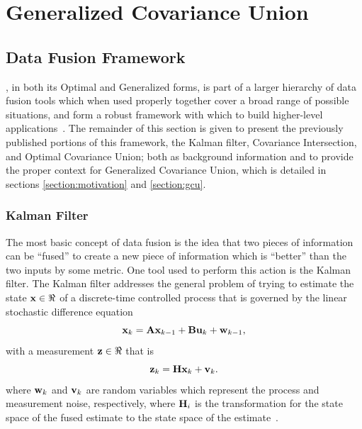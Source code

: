 \chapter{Generalized Covariance Union}\label{chapter:gcu}

\section{Data Fusion Framework}\label{section:framework}

, in both its Optimal and Generalized forms, is part of a larger hierarchy of data fusion
tools which when used properly together cover a broad range of possible situations, and form a robust framework with
which to build higher-level applications~\cite{fusion06,uhlmann03}. The remainder of this section is given to present
the previously published portions of this framework, the Kalman filter, Covariance Intersection, and Optimal Covariance
Union; both as background information and to provide the proper context for Generalized Covariance Union, which is 
detailed in sections \ref{section:motivation} and \ref{section:gcu}.


\subsection{Kalman Filter}

The most basic concept of data fusion is the idea that two pieces of information can be ``fused'' to create
a new piece of information which is ``better'' than the two inputs by some metric. One tool used to perform this action
is the Kalman filter. The Kalman filter addresses the general problem of trying to estimate the state $\mathbf{x}\in\Re$  of
a discrete-time controlled process that is governed by the linear stochastic difference equation
\begin{equation}\label{eqn:kalsto}
    \mathbf{x}_k = \mathbf{A}\mathbf{x}_{k-1} + \mathbf{B}\mathbf{u}_k + \mathbf{w}_{k-1} ,
\end{equation}
with a measurement $\mathbf{z}\in\Re$ that is
\begin{equation}\label{eqn:kalmeasure}
\mathbf{z}_k = \mathbf{H}\mathbf{x}_k + \mathbf{v}_k.
\end{equation}
where $\mathbf{w}_k$ and $\mathbf{v}_k$ are random variables which represent the process and measurement noise, respectively,
where $\mathbf{H}_i$ is the transformation for the state space of the fused estimate to the state space of the
estimate~\cite{siggraph01}.

